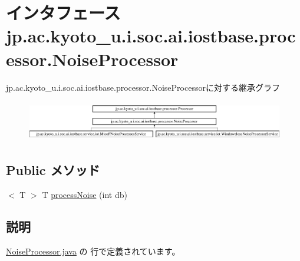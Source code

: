 \hypertarget{interfacejp_1_1ac_1_1kyoto__u_1_1i_1_1soc_1_1ai_1_1iostbase_1_1processor_1_1_noise_processor}{\section{インタフェース jp.\-ac.\-kyoto\-\_\-u.\-i.\-soc.\-ai.\-iostbase.\-processor.\-Noise\-Processor}
\label{interfacejp_1_1ac_1_1kyoto__u_1_1i_1_1soc_1_1ai_1_1iostbase_1_1processor_1_1_noise_processor}
}
jp.\-ac.\-kyoto\-\_\-u.\-i.\-soc.\-ai.\-iostbase.\-processor.\-Noise\-Processorに対する継承グラフ\begin{figure}[H]
\begin{center}
\leavevmode
\includegraphics[height=1.802575cm]{interfacejp_1_1ac_1_1kyoto__u_1_1i_1_1soc_1_1ai_1_1iostbase_1_1processor_1_1_noise_processor}
\end{center}
\end{figure}
\subsection*{Public メソッド}
\begin{DoxyCompactItemize}
\item 
$<$ T $>$ T \hyperlink{interfacejp_1_1ac_1_1kyoto__u_1_1i_1_1soc_1_1ai_1_1iostbase_1_1processor_1_1_noise_processor_af5f823d56ea89bbe6d18cc2a8fad44bd}{process\-Noise} (int db)
\end{DoxyCompactItemize}


\subsection{説明}


 \hyperlink{_noise_processor_8java_source}{Noise\-Processor.\-java} の  行で定義されています。



